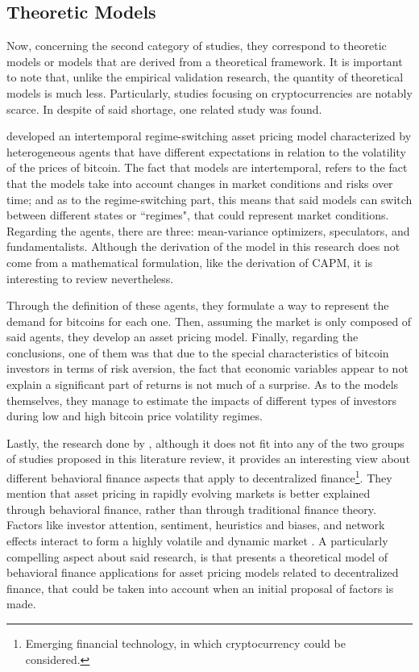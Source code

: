 \subsection{Theoretic Models}
Now, concerning the second category of studies, they correspond to theoretic models or models that are derived from a theoretical framework. It is important to note that, unlike the empirical validation research, the quantity of theoretical models is much less. Particularly, studies focusing on cryptocurrencies are notably scarce. In despite of said shortage, one related study was found.

\parencite{koutmos2021intertemporal} developed an intertemporal regime-switching asset pricing model characterized by heterogeneous agents that have different expectations in relation to the volatility of the prices of bitcoin. The fact that models are intertemporal, refers to the fact that the models take into account changes in market conditions and risks over time; and as to the regime-switching part, this means that said models can switch between different states or ``regimes", that could represent market conditions. Regarding the agents, there are three: mean-variance optimizers, speculators, and fundamentalists. Although the derivation of the model in this research does not come from a mathematical formulation, like the derivation of CAPM, it is interesting to review nevertheless. 

Through the definition of these agents, they formulate a way to represent the demand for bitcoins for each one. Then, assuming the market is only composed of said agents, they develop an asset pricing model. Finally, regarding the conclusions, one of them was that due to the special characteristics of bitcoin investors in terms of risk aversion, the fact that economic variables appear to not explain a significant part of returns is not much of a surprise. As to the models themselves, they manage to estimate the impacts of different types of investors during low and high bitcoin price volatility regimes. 

Lastly, the research done by \parencite{Bennett2023}, although it does not fit into any of the two groups of studies proposed in this literature review, it provides an interesting view about different behavioral finance aspects that apply to decentralized finance\footnote{Emerging financial technology, in which cryptocurrency could be considered.}. They mention that asset pricing in rapidly evolving markets is better explained through behavioral finance, rather than through traditional finance theory. Factors like investor attention, sentiment, heuristics and biases, and network effects interact to form a highly volatile and dynamic market \parencite{Bennett2023}. A particularly compelling aspect about said research, is that presents a theoretical model of behavioral finance applications for asset pricing models related to decentralized finance, that could be taken into account when an initial proposal of factors is made. 

